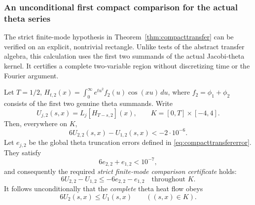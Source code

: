 \subsubsection{An unconditional first compact comparison for the actual theta series}
\label{sec:firstcertifiedrectangle}
The strict finite-mode hypothesis in
Theorem~\ref{thm:compacttransfer} can be verified
on an explicit, nontrivial rectangle.
Unlike tests of the abstract transfer algebra, this
calculation uses the first two summands of the
actual Jacobi-theta kernel. It certifies a complete
two-variable region without discretizing time
or the Fourier argument.

\begin{theorem}
\label{thm:firstcompactrectangle}
Let $T=1/2$, $H_{t,2}(x)=
\int_0^\infty e^{tu^2}f_2(u)\cos(xu)\,du$,
where $f_2=\phi_1+\phi_2$ consists of
the first two genuine theta summands.
Write
\[
U_{j,2}(s,x)=L_j[H_{T-s,2}](x),\qquad
K=[0,T]\times[-4,4].
\]
Then, everywhere on $K$,
\begin{equation}\label{eq:firstrectanglefinite}
\boxed{6U_{2,2}(s,x)-U_{1,2}(s,x)<-2\cdot10^{-6}.}
\end{equation}
Let $e_{j,2}$ be the global theta truncation
errors defined in \eqref{eq:compacttransfererror}.
They satisfy
\[
6e_{2,2}+e_{1,2}<10^{-7},
\]
and consequently the required \emph{strict
finite-mode comparison certificate} holds:
\begin{equation}\label{eq:firstrectanglecertified}
\boxed{6U_{2,2}-U_{1,2}
\le -6e_{2,2}-e_{1,2}\quad\text{throughout }K.}
\end{equation}
It follows unconditionally that the
\emph{complete} theta heat flow obeys
\[
\boxed{6U_2(s,x)\le U_1(s,x)
\qquad ((s,x)\in K).}
\]
\end{theorem}

